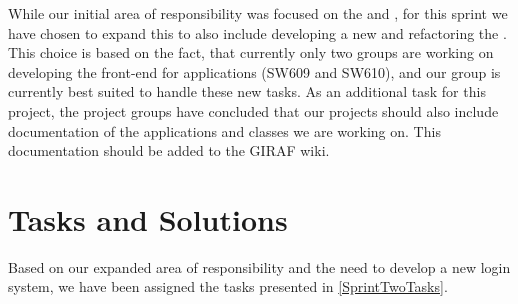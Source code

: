 While our initial area of responsibility was focused on the  and
, for this sprint we have chosen to expand this to
also include developing a new  and refactoring the
. This choice is based on the fact, that currently only
two groups are working on developing the front-end for applications (SW609 and
SW610), and our group is currently best suited to handle these new tasks. As an
additional task for this project, the project groups have concluded that our
projects should also include documentation of the applications and classes we
are working on. This documentation should be added to the GIRAF wiki.

\section{Tasks and Solutions}
Based on our expanded area of responsibility and the need to develop a new login
system, we have been assigned the tasks presented in \autoref{SprintTwoTasks}.

